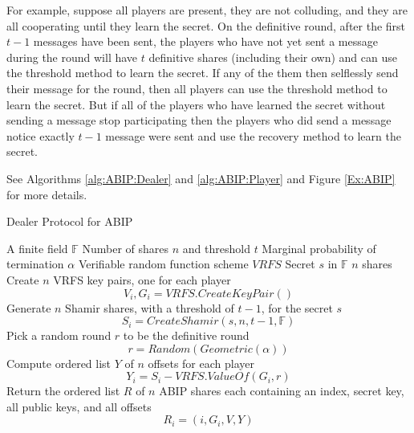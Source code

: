 \documentclass{dalcsthesis}
\begin{document}
For example, suppose all players are present, they are not colluding, and they are all cooperating until they learn the secret. On the definitive round, after the first $t-1$ messages have been sent, the players who have not yet sent a message during the round will have $t$ definitive shares (including their own) and can use the threshold method to learn the secret. If any of the them then selflessly send their message for the round, then all players can use the threshold method to learn the secret. But if all of the players who have learned the secret without sending a message stop participating then the players who did send a message notice exactly $t-1$ message were sent and use the recovery method to learn the secret.

See Algorithms \ref{alg:ABIP:Dealer} and \ref{alg:ABIP:Player} and Figure \ref{Ex:ABIP} for more details.

\begin{algorithm}
  \caption{Dealer Protocol for ABIP}
  \label{alg:ABIP:Dealer}
  \begin{algorithmic}
    \INPUT A finite field $\mathbb{F}$
    \INPUT Number of shares $n$ and threshold $t$
    \INPUT Marginal probability of termination $\alpha$
    \INPUT Verifiable random function scheme $VRFS$
    \INPUT Secret $s$ in $\mathbb{F}$
    \OUTPUT $n$ shares
    \STATE Create $n$ VRFS key pairs, one for each player
    	$$V_i, G_i = VRFS.CreateKeyPair()$$
    \STATE Generate $n$ Shamir shares, with a threshold of $t-1$, for the secret $s$
    	$$S_i = CreateShamir(s, n, t - 1, \mathbb{F})$$
    \STATE Pick a random round $r$ to be the definitive round
        $$r = Random(Geometric(\alpha))$$
    \STATE Compute ordered list $Y$ of $n$ offsets for each player
    	$$Y_i = S_i - VRFS.ValueOf(G_i, r)$$
    \STATE Return the ordered list $R$ of $n$ ABIP shares each containing an index, secret key, all public keys, and all offsets 
    	$$R_i = (i, G_i, V, Y)$$
  \end{algorithmic}
\end{algorithm}
\end{document}
